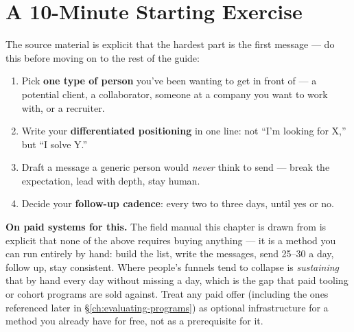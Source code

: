 \section{A 10-Minute Starting Exercise}

The source material is explicit that the hardest part is the first message --- do this before moving on to the
rest of the guide:

\begin{enumerate}
  \item Pick \textbf{one type of person} you've been wanting to get in front of --- a potential client, a
  collaborator, someone at a company you want to work with, or a recruiter.
  \item Write your \textbf{differentiated positioning} in one line: not ``I'm looking for X,'' but ``I solve Y.''
  \item Draft a message a generic person would \emph{never} think to send --- break the expectation, lead with
  depth, stay human.
  \item Decide your \textbf{follow-up cadence}: every two to three days, until yes or no.
\end{enumerate}

\begin{caution}
\textbf{On paid systems for this.} The field manual this chapter is drawn from is explicit that none of the above
requires buying anything --- it is a method you can run entirely by hand: build the list, write the messages,
send 25--30 a day, follow up, stay consistent. Where people's funnels tend to collapse is \emph{sustaining} that
by hand every day without missing a day, which is the gap that paid tooling or cohort programs are sold against.
Treat any paid offer (including the ones referenced later in \S\ref{ch:evaluating-programs}) as optional
infrastructure for a method you already have for free, not as a prerequisite for it.
\end{caution}
